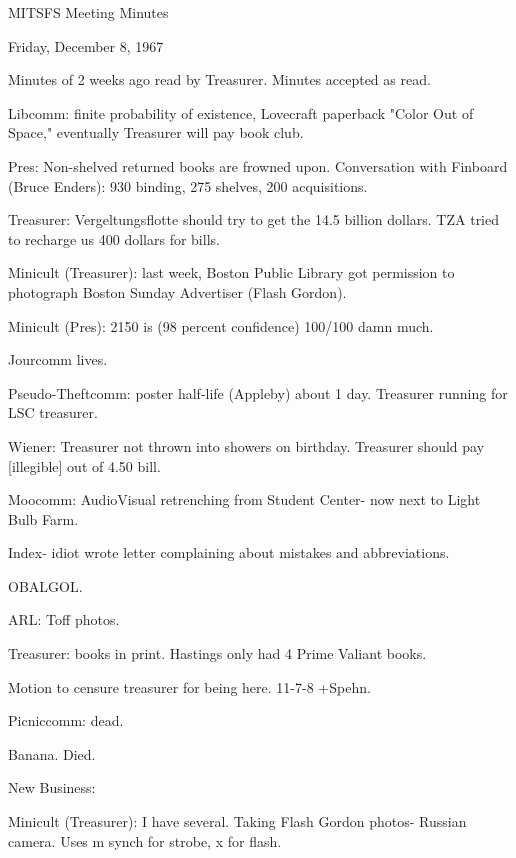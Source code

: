 \documentclass[12pt]{article}
\begin{document}
\begin{center}

MITSFS Meeting Minutes

Friday, December 8, 1967

\end{center}
 
\vspace{12pt}

\setlength{\parskip}{6pt}

\noindent
Minutes of 2 weeks ago read by Treasurer. Minutes accepted as read.

Libcomm: finite probability of existence, Lovecraft paperback "Color Out of Space," eventually Treasurer will pay book club.

Pres: Non-shelved returned books are frowned upon. Conversation with Finboard (Bruce Enders): 930 binding, 275 shelves, 200 acquisitions.

Treasurer: Vergeltungsflotte should try to get the 14.5 billion dollars. TZA tried to recharge us 400 dollars for bills.

Minicult (Treasurer): last week, Boston Public Library got permission to photograph Boston Sunday Advertiser (Flash Gordon).

Minicult (Pres): 2150 is (98 percent confidence) 100/100 damn much.

Jourcomm lives.

Pseudo-Theftcomm: poster half-life (Appleby) about 1 day. Treasurer running for LSC treasurer.

Wiener: Treasurer not thrown into showers on birthday. Treasurer should pay [illegible] out of 4.50 bill.

Moocomm: AudioVisual retrenching from Student Center- now next to Light Bulb Farm.

Index- idiot wrote letter complaining about mistakes and abbreviations.

OBALGOL.

ARL: Toff photos.

Treasurer: books in print. Hastings only had 4 Prime Valiant books.

Motion to censure treasurer for being here. 11-7-8 +Spehn.

Picniccomm: dead.

Banana. Died.

New Business:

Minicult (Treasurer): I have several. Taking Flash Gordon photos- Russian camera. Uses m synch for strobe, x for flash.
\end{document}
